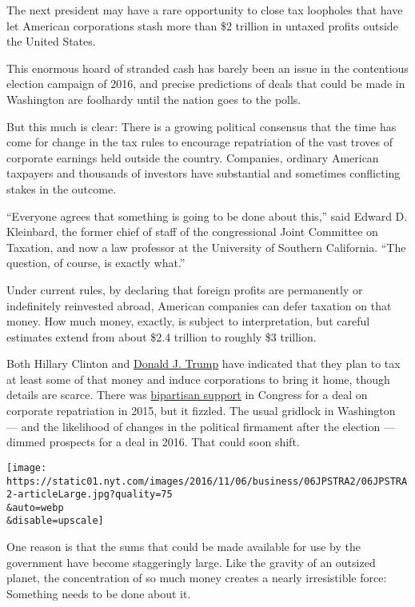 The next president may have a rare opportunity to close tax loopholes
that have let American corporations stash more than \$2 trillion in
untaxed profits outside the United States.

This enormous hoard of stranded cash has barely been an issue in the
contentious election campaign of 2016, and precise predictions of deals
that could be made in Washington are foolhardy until the nation goes to
the polls.

But this much is clear: There is a growing political consensus that the
time has come for change in the tax rules to encourage repatriation of
the vast troves of corporate earnings held outside the country.
Companies, ordinary American taxpayers and thousands of investors have
substantial and sometimes conflicting stakes in the outcome.

``Everyone agrees that something is going to be done about this,'' said
Edward D. Kleinbard, the former chief of staff of the congressional
Joint Committee on Taxation, and now a law professor at the University
of Southern California. ``The question, of course, is exactly what.''

Under current rules, by declaring that foreign profits are permanently
or indefinitely reinvested abroad, American companies can defer taxation
on that money. How much money, exactly, is subject to interpretation,
but careful estimates extend from about \$2.4 trillion to roughly \$3
trillion.

Both Hillary Clinton and
\href{http://www.nytimes.com/2016/08/13/upshot/how-hillary-clinton-and-donald-trump-differ-on-taxes.html}{Donald
J. Trump} have indicated that they plan to tax at least some of that
money and induce corporations to bring it home, though details are
scarce. There was
\href{http://www.nytimes.com/2015/07/09/business/end-to-us-taxation-of-overseas-profit-finds-bipartisan-support.html}{bipartisan
support} in Congress for a deal on corporate repatriation in 2015, but
it fizzled. The usual gridlock in Washington --- and the likelihood of
changes in the political firmament after the election --- dimmed
prospects for a deal in 2016. That could soon shift.

\texttt{[image: https://static01.nyt.com/images/2016/11/06/business/06JPSTRA2/06JPSTRA2-articleLarge.jpg?quality=75\\\&auto=webp\\\&disable=upscale]}

One reason is that the sums that could be made available for use by the
government have become staggeringly large. Like the gravity of an
outsized planet, the concentration of so much money creates a nearly
irresistible force: Something needs to be done about it.

